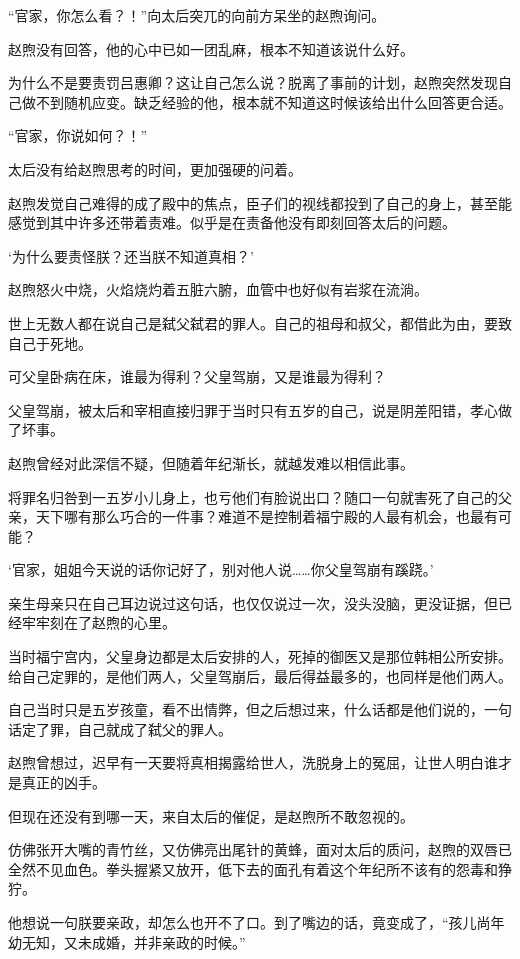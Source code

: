 “官家，你怎么看？！”向太后突兀的向前方呆坐的赵煦询问。

赵煦没有回答，他的心中已如一团乱麻，根本不知道该说什么好。

为什么不是要责罚吕惠卿？这让自己怎么说？脱离了事前的计划，赵煦突然发现自己做不到随机应变。缺乏经验的他，根本就不知道这时候该给出什么回答更合适。

“官家，你说如何？！”

太后没有给赵煦思考的时间，更加强硬的问着。

赵煦发觉自己难得的成了殿中的焦点，臣子们的视线都投到了自己的身上，甚至能感觉到其中许多还带着责难。似乎是在责备他没有即刻回答太后的问题。

‘为什么要责怪朕？还当朕不知道真相？’

赵煦怒火中烧，火焰烧灼着五脏六腑，血管中也好似有岩浆在流淌。

世上无数人都在说自己是弑父弑君的罪人。自己的祖母和叔父，都借此为由，要致自己于死地。

可父皇卧病在床，谁最为得利？父皇驾崩，又是谁最为得利？

父皇驾崩，被太后和宰相直接归罪于当时只有五岁的自己，说是阴差阳错，孝心做了坏事。

赵煦曾经对此深信不疑，但随着年纪渐长，就越发难以相信此事。

将罪名归咎到一五岁小儿身上，也亏他们有脸说出口？随口一句就害死了自己的父亲，天下哪有那么巧合的一件事？难道不是控制着福宁殿的人最有机会，也最有可能？

‘官家，姐姐今天说的话你记好了，别对他人说……你父皇驾崩有蹊跷。’

亲生母亲只在自己耳边说过这句话，也仅仅说过一次，没头没脑，更没证据，但已经牢牢刻在了赵煦的心里。

当时福宁宫内，父皇身边都是太后安排的人，死掉的御医又是那位韩相公所安排。给自己定罪的，是他们两人，父皇驾崩后，最后得益最多的，也同样是他们两人。

自己当时只是五岁孩童，看不出情弊，但之后想过来，什么话都是他们说的，一句话定了罪，自己就成了弑父的罪人。

赵煦曾想过，迟早有一天要将真相揭露给世人，洗脱身上的冤屈，让世人明白谁才是真正的凶手。

但现在还没有到哪一天，来自太后的催促，是赵煦所不敢忽视的。

仿佛张开大嘴的青竹丝，又仿佛亮出尾针的黄蜂，面对太后的质问，赵煦的双唇已全然不见血色。拳头握紧又放开，低下去的面孔有着这个年纪所不该有的怨毒和狰狞。

他想说一句朕要亲政，却怎么也开不了口。到了嘴边的话，竟变成了，“孩儿尚年幼无知，又未成婚，并非亲政的时候。”

